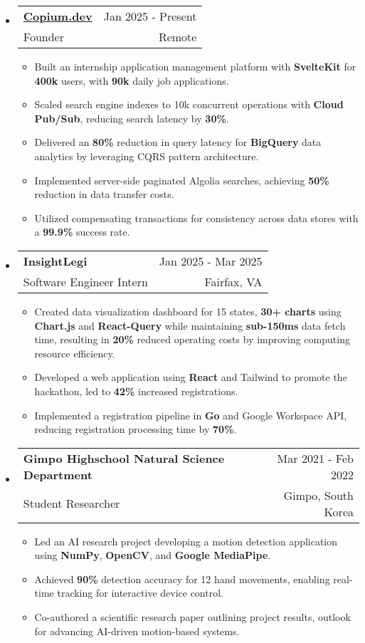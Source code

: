 \documentclass[letterpaper,11pt]{article}
\makeatletter
\newcommand{\resumeItem}[1]{
  \item{
    {#1}
  }
}
\newcommand{\resumeSubheading}[4]{
    \item
    \begin{tabular*}{0.985\textwidth}[t]{l@{\extracolsep{\fill}}r@{\hspace{-0.1in}}}
        {\textbf{#1}} & {#2} \\
        #3 &  #4 \\
    \end{tabular*}\vspace{-5pt}
}
\newcommand{\resumeSubHeadingListStart}{\begin{itemize}[leftmargin=0.00in, rightmargin=-0.2in, label={}]\vspace{3pt}}
\newcommand{\resumeSubHeadingListEnd}{\end{itemize}\vspace{-15pt}}
\newcommand{\resumeItemListStart}{\vspace{3pt}\begin{itemize}[leftmargin=0.15in, rightmargin=0.15in]}
\newcommand{\resumeItemListEnd}{\end{itemize}\vspace{-5pt}}
\makeatother
\begin{document}
\resumeSubHeadingListStart
\resumeSubheading
{\href{https://www.copium.dev}{Copium.dev}} {Jan 2025 - Present}
{Founder} {Remote}
\resumeItemListStart 
\resumeItem{Built an internship application management platform with \textbf{SvelteKit} for \textbf{400k} users, with \textbf{90k} daily job applications.}
\resumeItem{Scaled search engine indexes to 10k concurrent operations with \textbf{Cloud Pub/Sub}, reducing search latency by \textbf{30\%}.}
\resumeItem{Delivered an \textbf{80\%} reduction in query latency for \textbf{BigQuery} data analytics by leveraging CQRS pattern architecture.}
\resumeItem{Implemented server-side paginated Algolia searches, achieving \textbf{50\%} reduction in data transfer costs.}
\resumeItem{Utilized compensating transactions for consistency across data stores with a \textbf{99.9\%} success rate.}
\resumeItemListEnd
\resumeSubHeadingListEnd

\resumeSubHeadingListStart
\resumeSubheading
{InsightLegi} {Jan 2025 - Mar 2025}
{Software Engineer Intern} {Fairfax, VA}
\resumeItemListStart 
\resumeItem{Created data visualization dashboard for 15 states, \textbf{30+ charts} using \textbf{Chart.js} and \textbf{React-Query} while maintaining \textbf{sub-150ms} data fetch time, resulting in \textbf{20\%} reduced operating costs by improving computing resource efficiency.}
\resumeItem{Developed a web application using \textbf{React} and Tailwind to promote the hackathon, led to \textbf{42\%} increased registrations.}
\resumeItem{Implemented a registration pipeline in \textbf{Go} and Google Workspace API, reducing registration processing time by \textbf{70\%}.}
\resumeItemListEnd
\resumeSubHeadingListEnd



\resumeSubHeadingListStart
\resumeSubheading
{Gimpo Highschool Natural Science Department}{Mar 2021 - Feb 2022}
{Student Researcher}{Gimpo, South Korea}
\resumeItemListStart
\resumeItem{Led an AI research project developing a motion detection application using \textbf{NumPy}, \textbf{OpenCV}, and \textbf{Google MediaPipe}.}
\resumeItem{Achieved \textbf{90\%} detection accuracy for 12 hand movements, enabling real-time tracking for interactive device control.}
\resumeItem{Co-authored a scientific research paper outlining project results, outlook for advancing AI-driven motion-based systems.}
\resumeItemListEnd
\resumeSubHeadingListEnd
\end{document}
